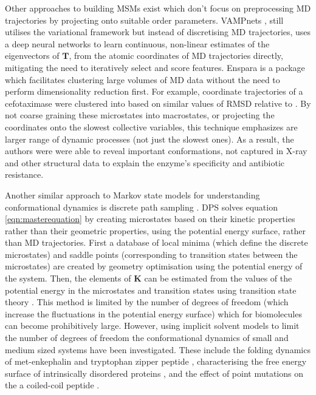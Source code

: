 Other approaches to building MSMs exist which don't focus on preprocessing MD trajectories by projecting onto suitable order parameters. VAMPnets \cite{mardtVAMPnetsDeepLearning2018}, still utilises the variational framework but instead of discretising MD trajectories, uses a deep neural networks to learn continuous, non-linear estimates of the eigenvectors of $\mathbf{T}$, from the atomic coordinates of MD trajectories directly, mitigating the need to iteratively select and score features.  Enspara \cite{porterEnsparaModelingMolecular2019} is a package which facilitates clustering large volumes of MD data without the need to perform dimensionality reduction first. For example, coordinate trajectories of a cefotaximase \cite{hartModellingProteinsHidden2016} were clustered into based on similar values of RMSD relative to .  By not coarse graining these microstates into macrostates, or projecting the coordinates onto the slowest collective variables, this technique emphasizes are larger range of dynamic processes (not just the slowest ones). As a result, the authors were were able to reveal important conformations, not captured in X-ray and other structural data to explain the enzyme's specificity and antibiotic resistance.  

Another similar approach to Markov state models  for understanding conformational dynamics is discrete path sampling \cite{walesEnergyLandscapesCalculating2006}. DPS solves equation \ref{eqn:masterequation} by creating  microstates based on their kinetic properties rather than their geometric properties, using the potential energy surface, rather than MD trajectories. First a database of local minima (which define the discrete microstates) and saddle points (corresponding to transition states between the microstates) are created by geometry optimisation using the potential energy of the system. Then, the elements of $\mathbf{K}$ can be estimated from the values of the potential energy in the microstates and transition states using transition state theory \cite{wales_2004}. This method is limited by the number of degrees of freedom (which increase the fluctuations in the potential energy surface) which for biomolecules can become prohibitively large\cite{noeTransitionNetworksModeling2008}. However, using implicit solvent models to limit the number of degrees of freedom the conformational dynamics of small and medium sized systems have been investigated. These include the folding dynamics of met-enkephalin \cite{evansFreeEnergyLandscape2003a} and tryptophan zipper peptide \cite{josephStructureThermodynamicsFolding2016}, characterising the free energy surface of intrinsically disordered proteins 
\cite{josephIntrinsicallyDisorderedLandscapes2018}, and the effect of point mutations on the a coiled-coil peptide \cite{roderTransformingEnergyLandscape2017}. 

